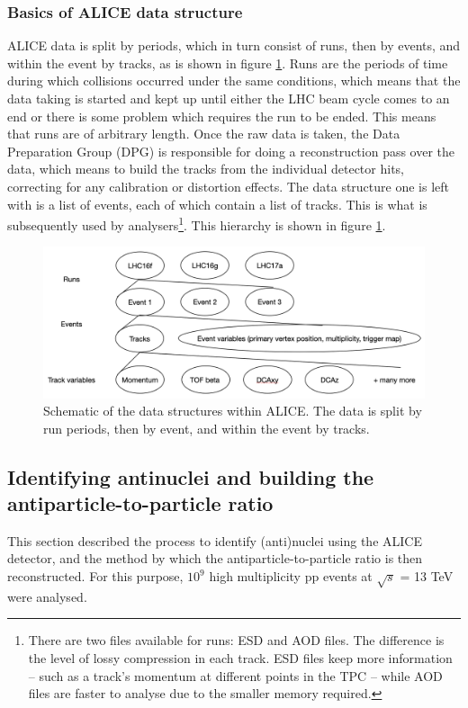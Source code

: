 \subsubsection{Basics of ALICE data structure}
ALICE data is split by periods, which in turn consist of runs, then by events, and within the event by tracks, as is shown in figure \ref{fig:ALICE_data_schematic}. Runs are the periods of time during which collisions occurred under the same conditions, which means that the data taking is started and kept up until either the LHC beam cycle comes to an end or there is some problem which requires the run to be ended. This means that runs are of arbitrary length. Once the raw data is taken, the Data Preparation Group (DPG) is responsible for doing a reconstruction pass over the data, which means to build the tracks from the individual detector hits, correcting for any calibration or distortion effects. The data structure  one is left with is a list of events, each of which contain a list of tracks. This is what is subsequently used by analysers\footnote{There are two files available for runs: ESD and AOD files. The difference is the level of lossy compression in each track. ESD files keep more information -- such as a track's momentum at different points in the TPC -- while AOD files are faster to analyse due to the smaller memory required.}. This hierarchy is shown in figure \ref{fig:ALICE_data_schematic}.

\begin{figure}
	\includegraphics[width=\textwidth]{figures/data_structure.png}
	\centering
	\caption{Schematic of the data structures within ALICE. The data is split by run periods, then by event, and within the event by tracks. }
		\label{fig:ALICE_data_schematic}
\end{figure}
\subsection{Identifying antinuclei and building the antiparticle-to-particle ratio}
This section described the process to identify (anti)nuclei using the ALICE detector, and the method by which the antiparticle-to-particle ratio is then reconstructed. For this purpose, $10^9$ high multiplicity pp events at $\sqrt{s}$ = 13 TeV were analysed. 
